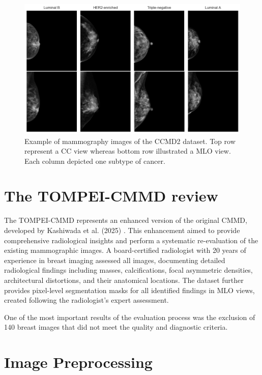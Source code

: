 \documentclass[a4paper,10pt]{book}
\begin{document}
\begin{figure}[h!]
	\centering
	\includegraphics[width=1\linewidth]{reports//assets/images_examples.png}
	\caption[CMMD2 mammography images examples]{Example of mammography images of the CCMD2 dataset. Top row represent a CC view whereas bottom row illustrated a MLO view. Each column depicted one subtype of cancer.}
	\label{fig:cmmd-examples}
\end{figure}

\newpage
\section{The TOMPEI-CMMD review}

The TOMPEI-CMMD represents an enhanced version of the original CMMD, developed by Kashiwada et al. (2025) \cite{kashiwada_tompei-cmmd_2025}. This enhancement aimed to provide comprehensive radiological insights and perform a systematic re-evaluation of the existing mammographic images. A board-certified radiologist with 20 years of experience in breast imaging assessed all images, documenting detailed radiological findings including masses, calcifications, focal asymmetric densities, architectural distortions, and their anatomical locations. The dataset further provides pixel-level segmentation masks for all identified findings in MLO views, created following the radiologist's expert assessment. 

One of the most important results of the evaluation process was the exclusion of 140 breast images that did not meet the quality and diagnostic criteria. 

\section{Image Preprocessing}
\end{document}

